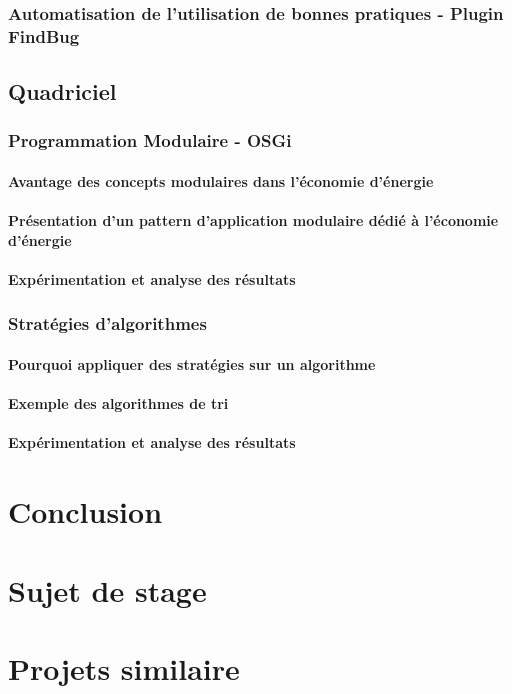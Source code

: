 \documentclass[a4paper, 11pt]{report}
\begin{document}
    \subsection{Automatisation de l'utilisation de bonnes pratiques - Plugin FindBug}

    \section{Quadriciel}
    \subsection{Programmation Modulaire - OSGi}
        \subsubsection{Avantage des concepts modulaires dans l'économie d'énergie}
        \subsubsection{Présentation d'un pattern d'application modulaire dédié à l'économie d'énergie}
        \subsubsection{Expérimentation et analyse des résultats}
    \subsection{Stratégies d'algorithmes}
        \subsubsection{Pourquoi appliquer des stratégies sur un algorithme}
        \subsubsection{Exemple des algorithmes de tri}
        \subsubsection{Expérimentation et analyse des résultats}
\chapter{Conclusion}

\appendix

\chapter{Sujet de stage}


\chapter{Projets similaire}

\listoffigures{}
\listoftables{}
\end{document}
